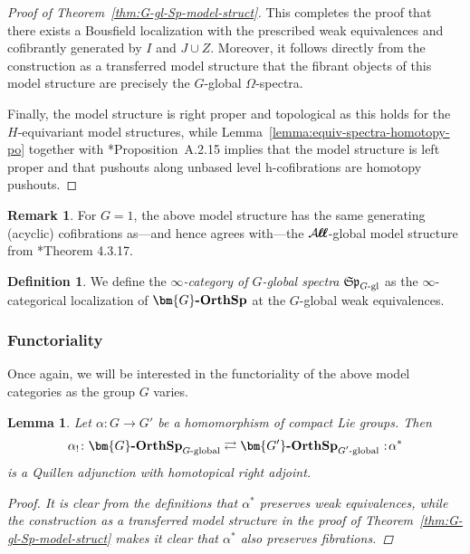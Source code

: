 \documentclass[reqno]{memo-l}
\theoremstyle{mythm}
\newtheorem{lemma}[thm]{Lemma}
\theoremstyle{definition}
\newtheorem{rk}[thm]{Remark}
\newtheorem{definition}[thm]{Definition}
\numberwithin{equation}{section}
\newcommand{\Aa}{{\mathcal{A}}}
\newcommand{\cat}[1]{\textbf{\textup{#1}}}
\newcommand{\bigAll}{\hbox{\hfuzz=20pt\hbox{$\mathcal A\kern-.3pt$}\setbox0=\hbox{$\ell\kern-.75pt\ell$}\hbox to 0pt{\hfuzz=8pt\kern-.075pt\unhcopy0}\hbox to 0pt{\hfuzz=8pt\kern.075pt\unhcopy0}\box0\kern.05pt}}
\newcommand{\smallAll}{\Aa\kern-.3pt\ell\kern-.6pt\ell}
\newcommand{\All}{\mathchoice{\bigAll}{\bigAll}{\smallAll}{\smallAll}}
\newcommand\noloc{%
	\nobreak
	\mspace{6mu plus 1mu}
	{:}
	\nonscript\mkern-\thinmuskip
	\mathpunct{}
	\mspace{2mu}
}
\newcommand{\mySp}{{\mathfrak S\kern-.5pt\mathfrak p}}
\newcommand{\Gosp}[1]{\cat{$\bm{#1}$-OrthSp}}
\begin{document}
\begin{proof}[Proof of Theorem~\ref{thm:G-gl-Sp-model-struct}]
    This completes the proof that there exists a Bousfield localization with the prescribed weak equivalences and cofibrantly generated by $I$ and $J\cup Z$. Moreover, it follows directly from the construction as a transferred model structure that the fibrant objects of this model structure are precisely the $G$-global $\Omega$-spectra.

    Finally, the model structure is right proper and topological as this holds for the $H$-equivariant model structures, while Lemma~\ref{lemma:equiv-spectra-homotopy-po} together with \cite{g-global}*{Proposition~A.2.15} implies that the model structure is left proper and that pushouts along unbased level h-cofibrations are homotopy pushouts.
\end{proof}

\begin{rk}
    For $G=1$, the above model structure has the same generating (acyclic) cofibrations as---and hence agrees with---the $\All$-global model structure from \cite{schwede2018global}*{Theorem 4.3.17}.
\end{rk}

\begin{definition}
    We define the \emph{$\infty$-category of $G$-global spectra} $\mySp_\textup{$G$-gl}$ as the $\infty$-categorical localization of $\Gosp{G}$ at the $G$-global weak equivalences.
\end{definition}

\subsubsection{Functoriality} Once again, we will be interested in the functoriality of the above model categories as the group $G$ varies.

\begin{lemma}\label{lemma:restr-gl-sp-right-Quillen} 
    Let $\alpha\colon G\to G'$ be a homomorphism of compact Lie groups. Then
    \[
        \alpha_!\colon\Gosp{G}_\textup{$G$-global}\rightleftarrows\Gosp{G'}_\textup{$G'$-global} \noloc \alpha^*
    \]
    is a Quillen adjunction with homotopical right adjoint.
    \begin{proof}
        It is clear from the definitions that $\alpha^*$ preserves weak equivalences, while the construction as a transferred model structure in the proof of Theorem~\ref{thm:G-gl-Sp-model-struct} makes it clear that $\alpha^*$ also preserves fibrations.
    \end{proof}
\end{lemma}
\end{document}
